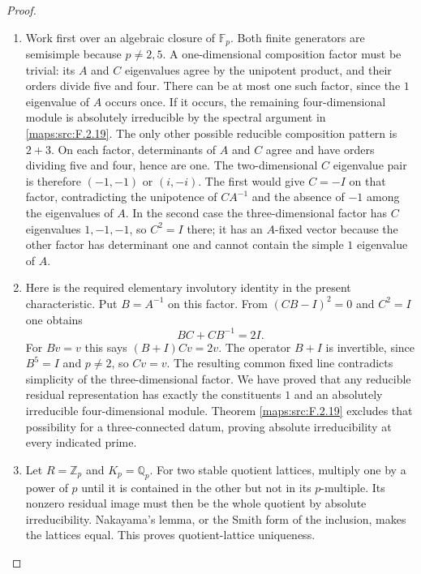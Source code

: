 \documentclass[11pt,a4paper]{article}
\numberwithin{equation}{section}
\theoremstyle{definition}
\begin{document}
\begin{proof}
\begin{enumerate}[label=\arabic*.]
\item Work first over an algebraic closure of $\mathbb F_p$.
Both finite generators are semisimple because $p\ne2,5$.
A one-dimensional composition factor must be trivial:
its $A$ and $C$ eigenvalues agree by the unipotent product,
and their orders divide five and four.
There can be at most one such factor, since the $1$
eigenvalue of $A$ occurs once.
If it occurs, the remaining four-dimensional module is
absolutely irreducible by the spectral argument in \ref{maps:src:F.2.19}.
The only other possible reducible composition pattern is
$2+3$.
On each factor, determinants of $A$ and $C$ agree and
have orders dividing five and four, hence are one.
The two-dimensional $C$ eigenvalue pair is therefore
$(-1,-1)$ or $(i,-i)$.
The first would give $C=-I$ on that factor, contradicting
the unipotence of $CA^{-1}$ and the absence of $-1$
among the eigenvalues of $A$.
In the second case the three-dimensional factor has
$C$ eigenvalues $1,-1,-1$, so $C^2=I$ there; it has
an $A$-fixed vector because the other factor has determinant
one and cannot contain the simple $1$ eigenvalue of $A$.

\item Here is the required elementary involutory identity in the
present characteristic.  Put $B=A^{-1}$ on this factor.
From $(CB-I)^2=0$ and $C^2=I$ one obtains
\[
 BC+CB^{-1}=2I.
\]
For $Bv=v$ this says $(B+I)Cv=2v$.
The operator $B+I$ is invertible, since $B^5=I$ and
$p\ne2$, so $Cv=v$.  The resulting common fixed line
contradicts simplicity of the three-dimensional factor.
We have proved that any reducible residual representation
has exactly the constituents $1$ and an absolutely
irreducible four-dimensional module.  Theorem \ref{maps:src:F.2.19}
excludes that possibility for a three-connected datum, proving absolute
irreducibility at every indicated prime.

\item Let $R=\mathbb Z_p$ and $K_p=\mathbb Q_p$.
For two stable quotient lattices, multiply one by a power
of $p$ until it is contained in the other but not in its
$p$-multiple.  Its nonzero residual image must then be the
whole quotient by absolute irreducibility.  Nakayama's
lemma, or the Smith form of the inclusion, makes the
lattices equal.  This proves quotient-lattice uniqueness.


\end{enumerate}
\end{proof}
\end{document}
